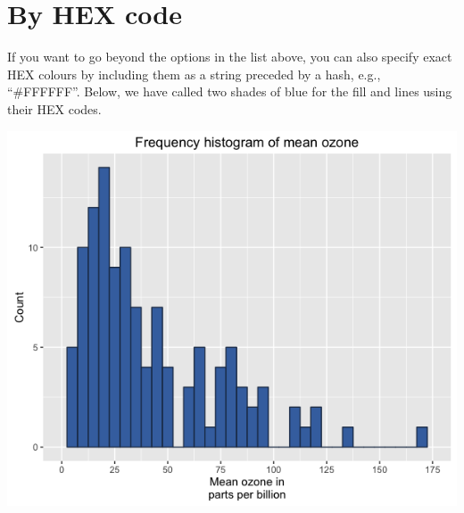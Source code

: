 \section{By HEX code}\label{by-hex-code}

If you want to go beyond the options in the list above, you can also
specify exact HEX colours by including them as a string preceded by a
hash, e.g., ``\#FFFFFF''. Below, we have called two shades of blue for
the fill and lines using their HEX codes.

\begin{Shaded}
\begin{Highlighting}[]

\StringTok{ }\NormalTok{(} \StringTok{ }
\StringTok{      }\NormalTok{(}\NormalTok{(}  \NormalTok{,}
\StringTok{        }  
\StringTok{      }\NormalTok{(} \NormalTok{,}
\StringTok{        } \NormalTok{(}\NormalTok{, }\NormalTok{, }\NormalTok{),}
\StringTok{        }\NormalTok{(}\NormalTok{, }\NormalTok{)) +}
\StringTok{      }\NormalTok{(} \NormalTok{) +}
\StringTok{      }\NormalTok{(}\NormalTok{)}
\end{Highlighting}
\end{Shaded}

\begin{center}\includegraphics[width=0.55\linewidth]{0_all_posts_pdf/histogram_10-1} \end{center}

